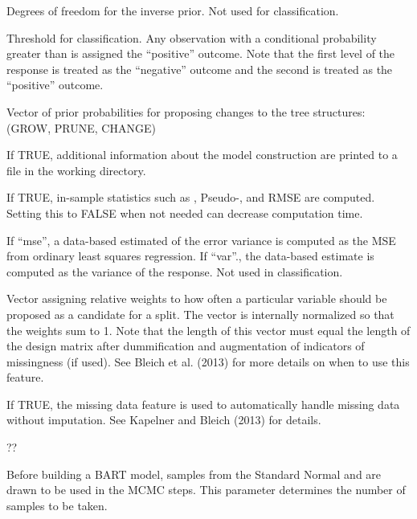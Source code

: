 \documentclass[a4paper]{book}
\begin{document}
\begin{Arguments}
\begin{ldescription}
\item[\code{nu}] 
Degrees of freedom for the inverse  prior. Not used for classification.

\item[\code{prob\_rule\_class}] 
Threshold for classification. Any observation with a conditional probability greater than  is assigned the ``positive'' outcome. Note that the first level of the response is treated as the ``negative'' outcome and the second is treated as the ``positive'' outcome.  

\item[\code{mh\_prob\_steps}] 
Vector of prior probabilities for proposing changes to the tree structures: (GROW, PRUNE, CHANGE)

\item[\code{debug\_log}] 
If TRUE, additional information about the model construction are printed to a file in the working directory.

\item[\code{run\_in\_sample}] 
If TRUE, in-sample statistics such as , Pseudo-, and RMSE are computed. Setting this to FALSE when not needed can decrease computation time. 

\item[\code{s\_sq\_y}] 
If ``mse'', a data-based estimated of the error variance is computed as the MSE from ordinary least squares regression. If ``var''., the data-based estimate is computed as the variance of the response. Not used in classification. 

\item[\code{cov\_prior\_vec}] 
Vector assigning relative weights to how often a particular variable should be proposed as a candidate for a split. The vector is internally normalized so that the weights sum to 1. Note that the length of this vector must equal the length of the design matrix after dummification and augmentation of indicators of missingness (if used). See Bleich et al. (2013) for more details on when to use this feature. 

\item[\code{use\_missing\_data}] 
If TRUE, the missing data feature is used to automatically handle missing data without imputation. See Kapelner and Bleich (2013) for details. 

\item[\code{covariates\_to\_permute}] 
??

\item[\code{num\_rand\_samps\_in\_library}] 
Before building a BART model, samples from the Standard Normal and  are drawn to be used in the MCMC steps. This parameter determines the number of samples to be taken.  


\end{ldescription}
\end{Arguments}
\end{document}
